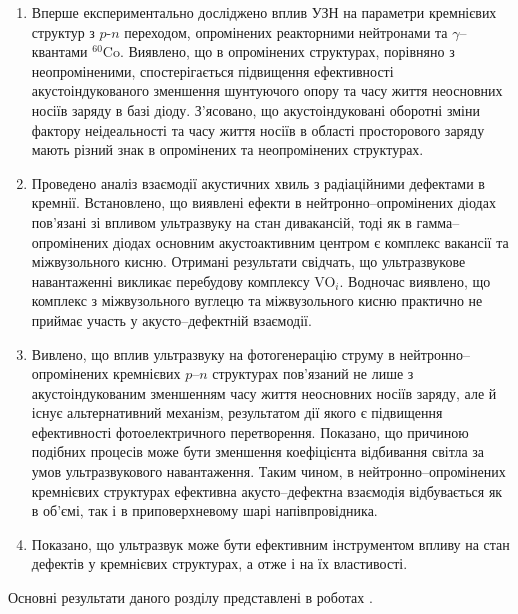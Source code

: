 \begin{enumerate}[leftmargin=0cm,itemindent=3em]
     \item Вперше експериментально досліджено вплив УЗН на параметри кремнієвих структур з $p$-$n$ переходом, опромінених  реакторними нейтронами та $\gamma$--квантами $^{60}$Co.
      Виявлено, що в опромінених структурах, порівняно з неопроміненими, спостерігається підвищення ефективності акустоіндукованого зменшення шунтуючого опору та часу життя неосновних носіїв заряду в базі діоду.
      З'ясовано, що акустоіндуковані оборотні зміни фактору неідеальності та часу життя носіїв в області просторового заряду   мають різний знак в опромінених та неопромінених структурах.

      \item Проведено аналіз взаємодії акустичних хвиль з радіаційними дефектами в кремнії.
      Встановлено, що виявлені ефекти в нейтронно--опромінених діодах пов'язані зі впливом ультразвуку на стан дивакансій,  тоді як в гамма--опромінених діодах основним акустоактивним центром є комплекс вакансії та міжвузольного кисню.
     Отримані результати свідчать, що ультразвукове навантаженні викликає перебудову комплексу VO$_i$.
     Водночас виявлено, що комплекс з міжвузольного вуглецю та міжвузольного кисню практично не приймає участь у
     акусто--дефектній взаємодії.


     \item Вивлено, що вплив ультразвуку на фотогенерацію струму в нейтронно--опромінених
     кремнієвих $p$--$n$ структурах пов'язаний не лише з
     акустоіндукованим зменшенням часу життя неосновних носіїв заряду, але й існує альтернативний механізм, результатом дії
     якого є підвищення ефективності фотоелектричного перетворення.
     Показано, що причиною подібних процесів може бути зменшення коефіцієнта відбивання світла за умов ультразвукового навантаження.
     Таким чином, в нейтронно--опромінених кремнієвих структурах ефективна акусто--дефектна
     взаємодія відбувається як в об'ємі, так і в
     приповерхневому шарі напівпровідника.


    \item Показано, що ультразвук може бути ефективним інструментом впливу на стан дефектів у кремнієвих структурах, а отже і на їх властивості.
  \end{enumerate}	

Основні результати даного розділу представлені в роботах
\cite{Olikh:Visn2003,Olikh:MRS2007,Olikh:SEMT2007,Olikh:FTP2009,Olikh:UPJ2010,Olikh:FTP2011,Olikh2018JAP,Olikh2018SM,
1SEMST,2005IUS,ICU2007SC,2007MRS,3UNCPS,6Drog,4UNCPS,4Kremen,6SEMST,2017MEICS}.



